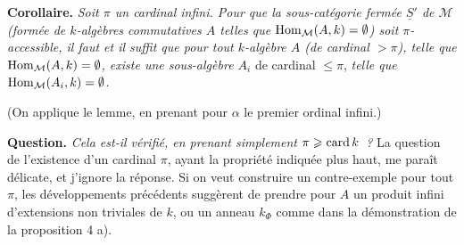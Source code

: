 
\noindent\textbf{Corollaire.} \textit{Soit $\pi$ un cardinal infini. Pour que la sous-catégorie fermée $\underline{S}'$ de $\mathcal{M}$ (formée de $k$-algèbres commutatives $A$ telles que $\operatorname{Hom}_{\mathcal{M}}(A,k)=\emptyset$) soit $\pi$-accessible, il faut et il suffit que pour tout $k$-algèbre $A$ (de cardinal ${}>\pi$), telle que $\operatorname{Hom}_{\mathcal{M}}(A,k)=\emptyset$, existe une sous-algèbre $A_i$} de cardinal $\leqslant\pi$, \textit{telle que $\operatorname{Hom}_{\mathcal{M}}(A_i,k)=\emptyset$.} %

\noindent(On applique le lemme, en prenant pour $\alpha$ le premier ordinal infini.)

\noindent\textbf{Question.} \textit{Cela est-il vérifié, en prenant simplement $\pi\geqslant\operatorname{card} k$~?} La question de l'existence d'un cardinal $\pi$, ayant la propriété indiquée plus haut, me paraît délicate, et j'ignore la réponse. Si on veut construire un contre-exemple pour tout $\pi$, les développements précédents suggèrent de prendre pour $A$ un produit infini d'extensions non triviales de $k$, ou un anneau $k_{\Phi}$ comme dans la démonstration de la proposition 4 a).


